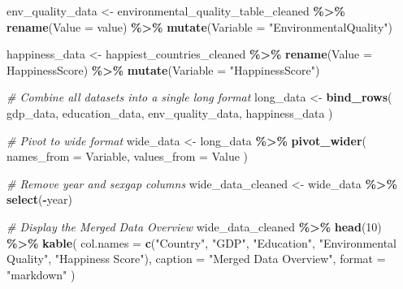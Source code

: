 \documentclass[
]{article}
\newenvironment{Shaded}{\begin{snugshade}}{\end{snugshade}}
\newcommand{\AttributeTok}[1]{\textcolor[rgb]{0.13,0.29,0.53}{#1}}
\newcommand{\CommentTok}[1]{\textcolor[rgb]{0.56,0.35,0.01}{\textit{#1}}}
\newcommand{\DecValTok}[1]{\textcolor[rgb]{0.00,0.00,0.81}{#1}}
\newcommand{\FunctionTok}[1]{\textcolor[rgb]{0.13,0.29,0.53}{\textbf{#1}}}
\newcommand{\NormalTok}[1]{#1}
\newcommand{\OtherTok}[1]{\textcolor[rgb]{0.56,0.35,0.01}{#1}}
\newcommand{\SpecialCharTok}[1]{\textcolor[rgb]{0.81,0.36,0.00}{\textbf{#1}}}
\newcommand{\StringTok}[1]{\textcolor[rgb]{0.31,0.60,0.02}{#1}}
\begin{document}
\begin{Shaded}
\begin{Highlighting}[]
\NormalTok{env\_quality\_data }\OtherTok{\textless{}{-}}\NormalTok{ environmental\_quality\_table\_cleaned }\SpecialCharTok{\%\textgreater{}\%}
  \FunctionTok{rename}\NormalTok{(}\AttributeTok{Value =}\NormalTok{ value) }\SpecialCharTok{\%\textgreater{}\%}
  \FunctionTok{mutate}\NormalTok{(}\AttributeTok{Variable =} \StringTok{"EnvironmentalQuality"}\NormalTok{)}

\NormalTok{happiness\_data }\OtherTok{\textless{}{-}}\NormalTok{ happiest\_countries\_cleaned }\SpecialCharTok{\%\textgreater{}\%}
  \FunctionTok{rename}\NormalTok{(}\AttributeTok{Value =}\NormalTok{ HappinessScore) }\SpecialCharTok{\%\textgreater{}\%}
  \FunctionTok{mutate}\NormalTok{(}\AttributeTok{Variable =} \StringTok{"HappinessScore"}\NormalTok{)}

\CommentTok{\# Combine all datasets into a single long format}
\NormalTok{long\_data }\OtherTok{\textless{}{-}} \FunctionTok{bind\_rows}\NormalTok{(}
\NormalTok{  gdp\_data,}
\NormalTok{  education\_data,}
\NormalTok{  env\_quality\_data,}
\NormalTok{  happiness\_data}
\NormalTok{)}

\CommentTok{\# Pivot to wide format}
\NormalTok{wide\_data }\OtherTok{\textless{}{-}}\NormalTok{ long\_data }\SpecialCharTok{\%\textgreater{}\%}
  \FunctionTok{pivot\_wider}\NormalTok{(}
    \AttributeTok{names\_from =}\NormalTok{ Variable,}
    \AttributeTok{values\_from =}\NormalTok{ Value}
\NormalTok{  )}

\CommentTok{\# Remove year and sexgap columns}
\NormalTok{wide\_data\_cleaned }\OtherTok{\textless{}{-}}\NormalTok{ wide\_data }\SpecialCharTok{\%\textgreater{}\%}
  \FunctionTok{select}\NormalTok{(}\SpecialCharTok{{-}}\NormalTok{year) }

\CommentTok{\# Display the Merged Data Overview}
\NormalTok{wide\_data\_cleaned }\SpecialCharTok{\%\textgreater{}\%}
  \FunctionTok{head}\NormalTok{(}\DecValTok{10}\NormalTok{) }\SpecialCharTok{\%\textgreater{}\%} 
  \FunctionTok{kable}\NormalTok{(}
    \AttributeTok{col.names =} \FunctionTok{c}\NormalTok{(}\StringTok{"Country"}\NormalTok{, }\StringTok{"GDP"}\NormalTok{, }\StringTok{"Education"}\NormalTok{, }\StringTok{"Environmental Quality"}\NormalTok{, }\StringTok{"Happiness Score"}\NormalTok{),}
    \AttributeTok{caption =} \StringTok{"Merged Data Overview"}\NormalTok{,}
    \AttributeTok{format =} \StringTok{"markdown"}
\NormalTok{  )}
\end{Highlighting}
\end{Shaded}
\end{document}
